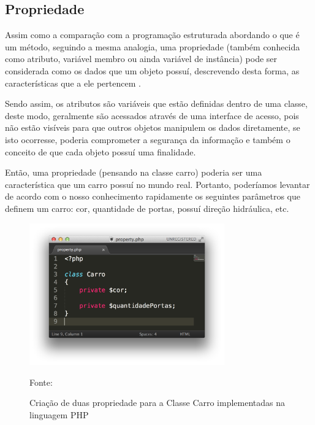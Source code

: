 \subsection{Propriedade}
Assim como a comparação com a programação estruturada abordando o que é um
método, seguindo a mesma analogia, uma propriedade (também conhecida como
atributo, variável membro ou ainda variável de instância) pode ser considerada
como os dados que um objeto possuí, descrevendo desta forma, as características
que a ele pertencem \cite{programmingPhp}.

Sendo assim, os atributos são variáveis que estão definidas dentro de uma
classe, deste modo, geralmente são acessados através de uma interface de acesso,
pois não estão visíveis para que outros objetos manipulem os dados diretamente,
se isto ocorresse, poderia comprometer a segurança da informação e também o
conceito de que cada objeto possuí uma finalidade.

Então, uma propriedade (pensando na classe carro) poderia ser uma característica
que um carro possuí no mundo real. Portanto, poderíamos levantar de acordo com
o nosso conhecimento rapidamente os seguintes parâmetros que definem um carro:
cor, quantidade de portas, possuí direção hidráulica, etc.

\begin{figure}[h!tb]
	\caption{Criação de duas propriedade para a Classe Carro implementadas na
	linguagem PHP}
	\label{fig:propriedade}

	\centering
	\includegraphics[width=0.75\textwidth]{images/property.png}

	\centering
	\footnotesize Fonte: \fonteOAutor
\end{figure}

\FloatBarrier 	%

